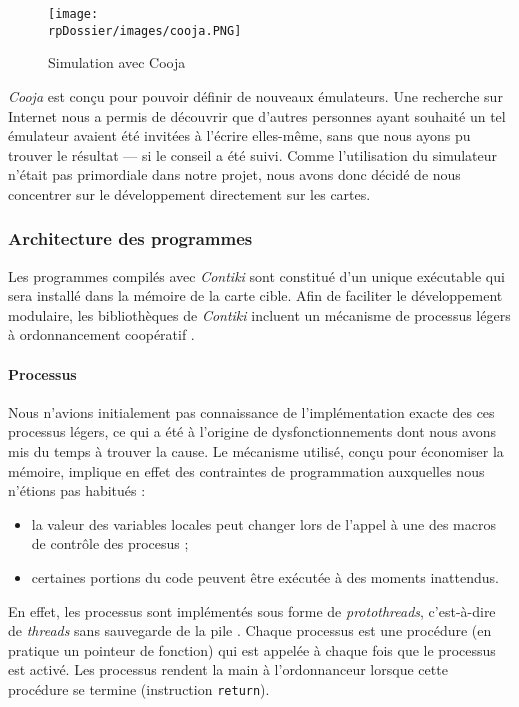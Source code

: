 \begin{figure}[H]
\centering
\texttt{[image: \\rpDossier/images/cooja.PNG]}
\caption{Simulation avec Cooja}
\label{cooja}
\end{figure}

\emph{Cooja} est conçu pour pouvoir définir de nouveaux émulateurs.
Une recherche sur Internet nous a permis de découvrir que d’autres personnes ayant souhaité un tel émulateur avaient été invitées à l’écrire elles-même, sans que nous ayons pu trouver le résultat — si le conseil a été suivi.
Comme l’utilisation du simulateur n’était pas primordiale dans notre projet, nous avons donc décidé de nous concentrer sur le développement directement sur les cartes.

\subsubsection{Architecture des programmes}

Les programmes compilés avec \emph{Contiki} sont constitué d’un unique exécutable qui sera installé dans la mémoire de la carte cible.
Afin de faciliter le développement modulaire, les bibliothèques de \emph{Contiki} incluent un mécanisme de processus légers à ordonnancement coopératif .

\paragraph{Processus}

Nous n’avions initialement pas connaissance de l’implémentation exacte des ces processus légers, ce qui a été à l’origine de dysfonctionnements dont nous avons mis du temps à trouver la cause.
Le mécanisme utilisé, conçu pour économiser la mémoire, implique en effet des contraintes de programmation auxquelles nous n’étions pas habitués :
\begin{itemize}
	\item la valeur des variables locales peut changer lors de l’appel à une des macros de contrôle des procesus ;
	\item certaines portions du code peuvent être exécutée à des moments inattendus.
\end{itemize}

En effet, les processus sont implémentés sous forme de \emph{protothreads}, c’est-à-dire de \emph{threads} sans sauvegarde de la pile .
Chaque processus est une procédure (en pratique un pointeur de fonction) qui est appelée à chaque fois que le processus est activé.
Les processus rendent la main à l’ordonnanceur lorsque cette procédure se termine (instruction \texttt{return}).

